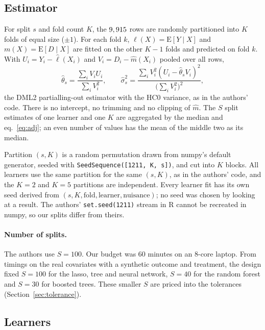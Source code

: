 \documentclass[11pt]{article}
\newcommand{\var}[1]{\texttt{#1}}
\begin{document}
\subsection{Estimator}

For split $s$ and fold count $K$, the $9,915$ rows are randomly partitioned into $K$
folds of equal size ($\pm 1$). For each fold $k$, $\ell(X) = \mathrm{E}[Y \mid X]$ and
$m(X) = \mathrm{E}[D \mid X]$ are fitted on the other $K-1$ folds and predicted on fold
$k$. With $U_i = Y_i - \hat\ell(X_i)$ and $V_i = D_i - \hat m(X_i)$ pooled over all rows,
\begin{equation}
  \hat\theta_s = \frac{\sum_i V_i U_i}{\sum_i V_i^2}, \qquad
  \hat\sigma_s^2 = \frac{\sum_i V_i^2 (U_i - \hat\theta_s V_i)^2}{\big(\sum_i V_i^2\big)^2},
  \label{eq:dml2}
\end{equation}
the DML2 partialling-out estimator with the HC0 variance, as in the authors' code. There
is no intercept, no trimming and no clipping of $\hat m$. The $S$ split estimates of one
learner and one $K$ are aggregated by the median and eq.~\eqref{eq:adj}; an even number
of values has the mean of the middle two as its median.

Partition $(s, K)$ is a random permutation drawn from numpy's default generator,
seeded with \var{SeedSequence([1211, K, s])}, and cut into $K$ blocks.
All learners use the same partition for the same $(s, K)$, as in the authors' code, and
the $K = 2$ and $K = 5$ partitions are independent. Every learner fit has its own seed
derived from $(s, K, \text{fold}, \text{learner}, \text{nuisance})$; no seed was chosen
by looking at a result. The authors' \var{set.seed(1211)} stream in R cannot be recreated
in numpy, so our splits differ from theirs.

\paragraph{Number of splits.} The authors use $S = 100$. Our budget was 60 minutes on an
8-core laptop. From timings on the real covariates with a synthetic outcome and
treatment, the design fixed $S = 100$ for the lasso, tree and neural network, $S = 40$
for the random forest and $S = 30$ for boosted trees. These smaller $S$ are priced into
the tolerances (Section~\ref{sec:tolerance}).

\subsection{Learners}
\end{document}
